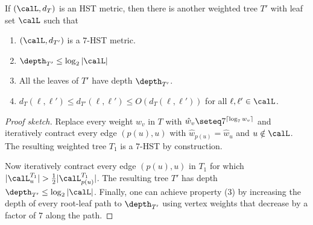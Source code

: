 %
\begin{lemma}%
	If $(\calL,d_T)$ is an HST metric, then there is another weighted tree $T'$ with leaf set $\calL$
	such that
	\begin{enumerate}
		\item $(\calL,d_{T'})$ is a $7$-HST metric.
		\item  $\depth_{T'} \leq \log_2 |\calL|$
		\item All the leaves of $T'$ have depth $\depth_{T'}$.
		\item $d_T(\ell,\ell') \leq d_{T'}(\ell,\ell') \leq O(d_T(\ell,\ell'))$ for all $\ell,\ell' \in \calL$.
	\end{enumerate}
\end{lemma}
\begin{proof}[Proof sketch]
	Replace every weight $w_v$ in $T$ with $\hat{w}_v \seteq 7^{\lceil \log_7 w_v\rceil}$ and iteratively contract every edge $(p(u),u)$
	with $\hat{w}_{p(u)}=\hat{w}_u$ and $u \notin \calL$.
	The resulting weighted tree $T_1$ is a $7$-HST by construction.
	
	Now iteratively contract every edge $(p(u),u)$ in $T_1$ for which $|\calL^{T_1}_{u}| > \frac12 |\calL^{T_1}_{p(u)}|$.
	The resulting tree $T'$ has depth $\depth_{T'} \leq \log_2 |\calL|$.
	Finally, one can achieve property (3) by increasing the depth of every root-leaf path to $\depth_{T'}$
	using vertex weights that decrease by a factor of $7$ along the path.
\end{proof}

